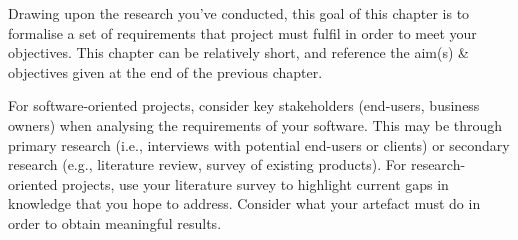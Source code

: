 Drawing upon the research you've conducted, this goal of this chapter is to formalise a set of requirements that project must fulfil in order to meet your objectives. This chapter can be relatively short, and reference the aim(s) \& objectives given at the end of the previous chapter. 

For software-oriented projects, consider key stakeholders (end-users, business owners) when analysing the requirements of your software. This may be through primary research (i.e., interviews with potential end-users or clients) or secondary research (e.g., literature review, survey of existing products). For research-oriented projects, use your literature survey to highlight current gaps in knowledge that you hope to address. Consider what your artefact must do in order to obtain meaningful results.